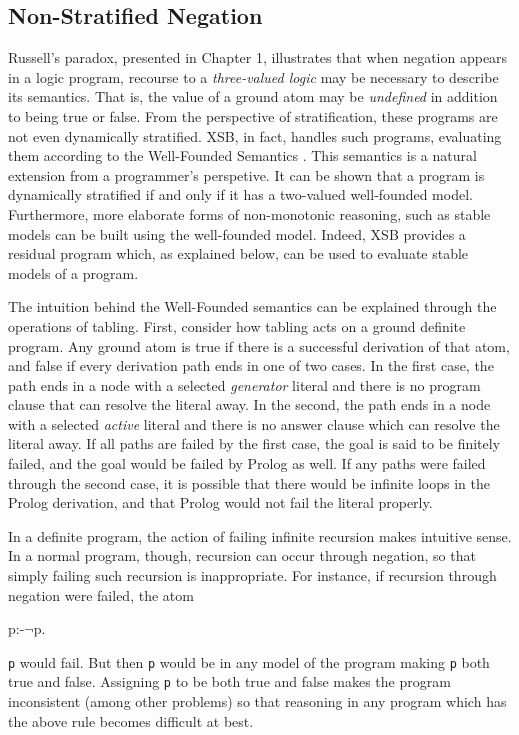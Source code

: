 \subsection{Non-Stratified Negation}

Russell's paradox, presented in Chapter 1, illustrates that when
negation appears in a logic program, recourse to a {\em three-valued
logic} may be necessary to describe its semantics.  That is, the value
of a ground atom may be {\em undefined} in addition to being true or
false.  From the perspective of stratification, these programs are not
even dynamically stratified.  XSB, in fact, handles such programs,
evaluating them according to the Well-Founded Semantics \cite{VGRS91}.
This semantics is a natural extension from a programmer's perspetive.
It can be shown that a program is dynamically stratified if and only
if it has a two-valued well-founded model.  Furthermore, more
elaborate forms of non-monotonic reasoning, such as stable models
\cite{GeLi88} can be built using the well-founded model.  Indeed, XSB
provides a residual program which, as explained below, can be used to
evaluate stable models of a program.

The intuition behind the Well-Founded semantics can be explained
through the operations of tabling.  First, consider how tabling acts
on a ground definite program.  Any ground atom is true if there is a
successful derivation of that atom, and false if every derivation path
ends in one of two cases.  In the first case, the path ends in a node
with a selected {\em generator} literal and there is no program clause
that can resolve the literal away.  In the second, the path ends in a
node with a selected {\em active} literal and there is no answer
clause which can resolve the literal away.  If all paths are failed by
the first case, the goal is said to be finitely failed, and the goal
would be failed by Prolog as well.  If any paths were failed through
the second case, it is possible that there would be infinite loops in
the Prolog derivation, and that Prolog would not fail the literal
properly.

In a definite program, the action of failing infinite recursion makes
intuitive sense.  In a normal program, though, recursion can occur
through negation, so that simply failing such recursion is
inappropriate.  For instance, if recursion through negation were
failed, the atom
\begin{Prog}
p:-$\neg$p.
\end{Prog}
{\tt p} would fail.  But then {\tt p} would be in any model of the
program making {\tt p} both true and false.  Assigning {\tt p} to be
both true and false makes the program inconsistent (among other
problems) so that reasoning in any program which has the above rule
becomes difficult at best.

